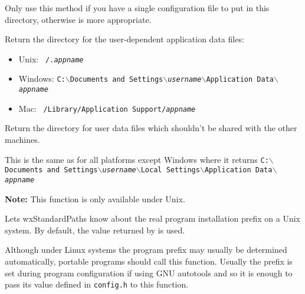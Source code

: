 Only use this method if you have a single configuration file to put in this
directory, otherwise  is
more appropriate.


\label{wxstandardpathsgetuserdatadir}


Return the directory for the user-dependent application data files:
\begin{itemize}
    \item Unix: \tt{~/.\textit{appname}}
    \item Windows: \tt{C:$\backslash$Documents and Settings$\backslash$\textit{username}$\backslash$Application Data$\backslash$\textit{appname}}
    \item Mac: \tt{~/Library/Application Support/\textit{appname}}
\end{itemize}


\label{wxstandardpathsgetuserlocaldatadir}


Return the directory for user data files which shouldn't be shared with
the other machines.

This is the same as  for
all platforms except Windows where it returns 
\texttt{C:$\backslash$Documents and Settings$\backslash$\textit{username}$\backslash$Local Settings$\backslash$Application Data$\backslash$\textit{appname}}


\label{wxstandardpathssetinstallprefix}


\textbf{Note:} This function is only available under Unix.

Lets wxStandardPaths know about the real program installation prefix on a Unix
system. By default, the value returned by 
 is used.

Although under Linux systems the program prefix may usually be determined
automatically, portable programs should call this function. Usually the prefix
is set during program configuration if using GNU autotools and so it is enough
to pass its value defined in \texttt{config.h} to this function.


